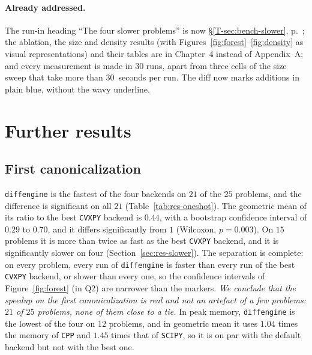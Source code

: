 \documentclass[letterpaper,12pt]{article}
\newcommand{\tsec}[1]{\S\ref{T-#1}}
\newcommand{\tpage}[1]{p.~\pageref{T-#1}}
\newcommand{\tref}[1]{\tsec{#1}, \tpage{#1}}
\begin{document}
\paragraph{Already addressed.}
The run-in heading ``The four slower problems'' is now \tref{sec:bench-slower}; the ablation,
the size and density results (with Figures~\ref{fig:forest}--\ref{fig:density} as visual
representations) and their tables are in Chapter~4 instead of Appendix~A; and every
measurement is made in $30$ runs, apart from three cells of the size sweep that take more than
$30$~seconds per run. The diff now marks additions in plain blue, without the wavy underline.

\section{Further results}\label{sec:results}

\subsection{First canonicalization}\label{sec:res-oneshot}
\texttt{diffengine} is the fastest of the four backends on $21$ of the $25$ problems, and the
difference is significant on all $21$ (Table~\ref{tab:res-oneshot}). The geometric mean of its
ratio to the best \texttt{CVXPY} backend is $0.44$, with a bootstrap confidence interval of
$0.29$ to $0.70$, and it differs significantly from $1$ (Wilcoxon, $p = 0.003$). On $15$
problems it is more than twice as fast as the best \texttt{CVXPY} backend, and it is
significantly slower on four (Section~\ref{sec:res-slower}). The separation is complete: on
every problem, every run of \texttt{diffengine} is faster than every run of the best
\texttt{CVXPY} backend, or slower than every one, so the confidence intervals of
Figure~\ref{fig:forest} (in Q2) are narrower than the markers. \emph{We conclude that the speedup on the
first canonicalization is real and not an artefact of a few problems: $21$ of $25$ problems,
none of them close to a tie.} In peak memory, \texttt{diffengine} is the lowest of the four on
$12$ problems, and in geometric mean it uses $1.04$ times the memory of \texttt{CPP} and $1.45$
times that of \texttt{SCIPY}, so it is on par with the default backend but not with the best
one.
\end{document}
